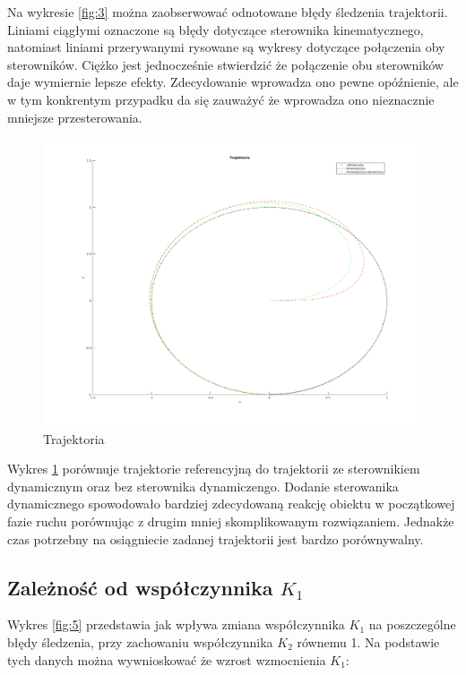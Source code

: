 \documentclass[12pt,a4paper]{article}
\begin{document}
    Na wykresie \ref{fig:3} można zaobserwować odnotowane błędy śledzenia trajektorii. Liniami ciągłymi oznaczone są błędy dotyczące sterownika kinematycznego, natomiast liniami przerywanymi rysowane są wykresy dotyczące połączenia oby sterowników. Ciężko jest jednocześnie stwierdzić że połączenie obu sterowników daje wymiernie lepsze efekty. Zdecydowanie wprowadza ono pewne opóźnienie, ale w tym konkrentym przypadku da się zauważyć że wprowadza ono nieznacznie mniejsze przesterowania. 

    \begin{figure}[H]
      \centering
      \includegraphics[width=1\textwidth]{figures/dyn_trajektoria.png}
      \caption{Trajektoria}
      \label{fig:4}
    \end{figure}

    Wykres \ref{fig:4} porównuje trajektorie referencyjną do trajektorii ze sterownikiem dynamicznym oraz bez sterownika dynamiczengo. Dodanie sterowanika dynamicznego spowodowało bardziej zdecydowaną reakcję obiektu w początkowej fazie ruchu porównując z drugim mniej skomplikowanym rozwiązaniem. Jednakże czas potrzebny na osiągniecie zadanej trajektorii jest bardzo porównywalny. 

  \subsection{Zależność od współczynnika $K_1$}
  Wykres \ref{fig:5} przedstawia jak wpływa zmiana współczynnika $K_1$ na poszczególne błędy śledzenia, przy zachowaniu współczynnika $K_2$ równemu 1. Na podstawie tych danych można wywnioskować że wzrost wzmocnienia $K_1$:
\end{document}
